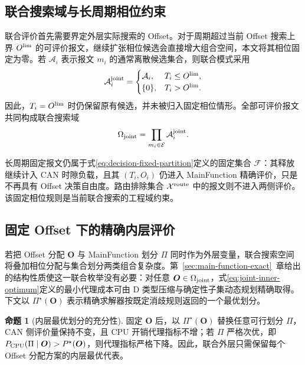 \documentclass[UTF8,a4paper,twoside,zihao=-4]{ctexart}
\numberwithin{equation}{section}
\numberwithin{figure}{section}
\numberwithin{table}{section}
\theoremstyle{definition}
\newtheorem{proposition}{命题}
\newcommand{\Oset}{\mathcal{A}}
\newcommand{\Eset}{\mathcal{E}}
\newcommand{\Xset}{\mathcal{X}}
\newcommand{\Fset}{\mathcal{F}}
\numberwithin{algocf}{section}
\begin{document}
\subsection{联合搜索域与长周期相位约束}
\label{subsec:joint-long-period-policy}

联合评价首先需要界定外层实际搜索的 Offset。对于周期超过当前 Offset 搜索上界 $O^{\rm lim}$ 的可评价报文，继续扩张相位候选会直接增大组合空间，本文将其相位固定为零。若 $\Oset_i$ 表示报文 $m_i$ 的通常离散候选集合，则联合模式采用
\begin{equation}
 \Oset_i^{\rm joint}
 =
 \begin{cases}
  \Oset_i, & T_i\le O^{\rm lim},\\
  \{0\}, & T_i>O^{\rm lim}.
 \end{cases}
\label{eq:joint-offset-candidates}
\end{equation}
因此，$T_i=O^{\rm lim}$ 时仍保留原有候选，并未被归入固定相位情形。全部可评价报文共同构成联合搜索域
\begin{equation}
 \Omega_{\rm joint}
 =
 \prod_{m_i\in\Eset}\Oset_i^{\rm joint}.
\label{eq:joint-offset-domain}
\end{equation}

长周期固定报文仍属于式\eqref{eq:decision-fixed-partition}定义的固定集合 $\Fset$：其释放继续计入 CAN 时隙负载，且其 $(T_i,O_i)$ 仍进入 MainFunction 精确评价，只是不再具有 Offset 决策自由度。路由排除集合 $\Xset^{\rm route}$ 中的报文则不进入两侧评价。该固定相位规则是当前联合搜索的工程域约束。

\subsection{固定 Offset 下的精确内层评价}
\label{subsec:joint-layered-solver}

若把 Offset 分配 $\boldsymbol O$ 与 MainFunction 划分 $\Pi$ 同时作为外层变量，联合搜索空间将叠加相位分配与集合划分两类组合复杂度。第~\ref{sec:main-function-exact}~章给出的结构性质使这一联合枚举没有必要：对任意 $\boldsymbol O\in\Omega_{\rm joint}$，式\eqref{eq:joint-inner-optimum}定义的最小代理成本可由 D 类型压缩与确定性子集动态规划精确取得。下文以 $\Pi^\star(\boldsymbol O)$ 表示精确求解器按既定消歧规则返回的一个最优划分。

\begin{proposition}[内层最优划分的充分性]
\label{prop:inner-optimal-partition-suffices}
固定 $\boldsymbol O$ 后，以 $\Pi^\star(\boldsymbol O)$ 替换任意可行划分 $\Pi$，CAN 侧评价量保持不变，且 CPU 开销代理指标不增；若 $\Pi$ 严格次优，即 $P_{\rm CPU}(\Pi\mid\boldsymbol O)>P^\star(\boldsymbol O)$，则代理指标严格下降。因此，联合外层只需保留每个 Offset 分配方案的内层最优代表。
\end{proposition}
\end{document}

